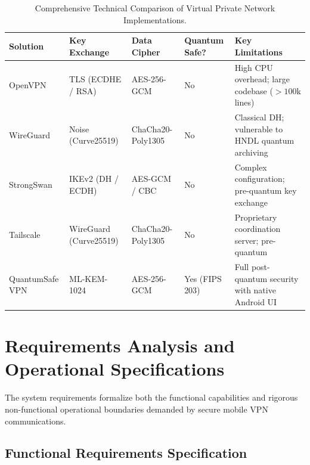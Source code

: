 \begin{table}[htbp]
  \centering
  \footnotesize
  \setlength{\tabcolsep}{3.5pt}
  \caption{Comprehensive Technical Comparison of Virtual Private Network Implementations.}
  \label{tab:vpn_solutions_matrix}
  \begin{tabularx}{\linewidth}{@{}p{2.3cm}p{2.3cm}p{2.2cm}p{1.9cm}Y@{}}
    \toprule
    \textbf{Solution} & \textbf{Key Exchange} & \textbf{Data Cipher} & \textbf{Quantum Safe?} & \textbf{Key Limitations} \\
    \midrule
    OpenVPN & TLS (ECDHE / RSA) & AES-256-GCM & No & High CPU overhead; large codebase ($>100$k lines) \\
    WireGuard & Noise (Curve25519) & ChaCha20-Poly1305 & No & Classical DH; vulnerable to HNDL quantum archiving \\
    StrongSwan & IKEv2 (DH / ECDH) & AES-GCM / CBC & No & Complex configuration; pre-quantum key exchange \\
    Tailscale & WireGuard (Curve25519) & ChaCha20-Poly1305 & No & Proprietary coordination server; pre-quantum \\
    QuantumSafe VPN & ML-KEM-1024 & AES-256-GCM & Yes (FIPS 203) & Full post-quantum security with native Android UI \\
    \bottomrule
  \end{tabularx}
\end{table}

\section{Requirements Analysis and Operational Specifications}
\label{sec:requirements_analysis}
\label{chap:requirements}

The system requirements formalize both the functional capabilities and rigorous non-functional operational boundaries demanded by secure mobile VPN communications.

\subsection{Functional Requirements Specification}
\label{sec:functional_requirements}

